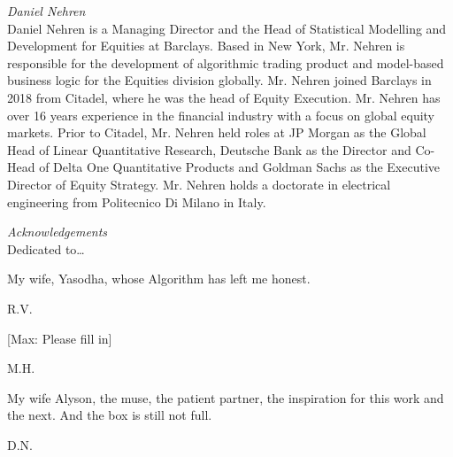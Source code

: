 {\noindent\large\itshape Daniel Nehren} \\[0.2cm]
\noindent Daniel Nehren is a Managing Director and the Head of Statistical Modelling and Development for Equities at Barclays. Based in New York, Mr. Nehren is responsible for the development of algorithmic trading product and model-based business logic for the Equities division globally. Mr. Nehren joined Barclays in 2018 from Citadel, where he was the head of Equity Execution. Mr. Nehren has over 16 years experience in the financial industry with a focus on global equity markets. Prior to Citadel, Mr. Nehren held roles at JP Morgan as the Global Head of Linear Quantitative Research, Deutsche Bank as the Director and Co-Head of Delta One Quantitative Products and Goldman Sachs as the Executive Director of Equity Strategy. Mr. Nehren holds a doctorate in electrical engineering from Politecnico Di Milano in Italy.



\newpage



{\itshape \large Acknowledgements} \\

Dedicated to\dots \\

\begin{minipage}[t]{0.8\textwidth}
	\raggedright
  	My wife, Yasodha, whose Algorithm has left me honest. \par
  	\raggedleft
  	R.V.
\end{minipage} \vspace{1cm}


\begin{minipage}[t]{0.8\textwidth}
	\raggedright
  	[Max: Please fill in] \par
  	\raggedleft
  	M.H.
\end{minipage} \vspace{1cm}


\begin{minipage}[t]{0.8\textwidth}
	\raggedright
  	My wife Alyson, the muse, the patient partner, the inspiration for this work and the next. And the box is still not full. \par
  	\raggedleft
  	D.N.
\end{minipage} 


















